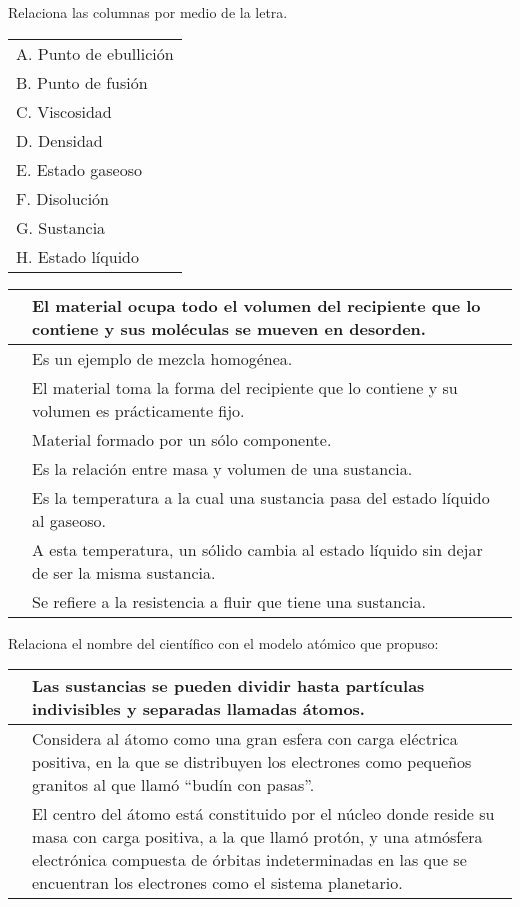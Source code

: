\documentclass[12pt]{exam}
\begin{document}
\begin{questions}
    \question Relaciona las columnas por medio de la letra.
\\[0.5em]
\begin{tabular}{l}
A. Punto de ebullición \\
B. Punto de fusión \\
C. Viscosidad \\
D. Densidad \\
E. Estado gaseoso \\
F. Disolución \\
G. Sustancia \\
H. Estado líquido \\
\end{tabular}
\begin{tabular}{| p{2cm} | p{9cm} |} \hline
 & El material ocupa todo el volumen del recipiente que lo contiene y sus moléculas se mueven en desorden. \\ \hline
 & Es un ejemplo de mezcla homogénea. \\ \hline
 & El material toma la forma del recipiente que lo contiene y su volumen es prácticamente fijo. \\ \hline
 & Material formado por un sólo componente. \\ \hline
 & Es la relación entre masa y volumen de una sustancia. \\ \hline
 & Es la temperatura a la cual una sustancia pasa del estado líquido al gaseoso.\\ \hline
 & A esta temperatura, un sólido cambia al estado líquido sin dejar de ser la misma sustancia. \\ \hline
 & Se refiere a la resistencia a fluir que tiene una sustancia. \\ \hline
\end{tabular}
    \question Relaciona el nombre del científico con el modelo atómico que propuso:
\\[1em]
\begin{tabular}{| p{2cm} | p{10cm} | } \hline
 & Las sustancias se pueden dividir hasta partículas indivisibles y separadas llamadas átomos. \\ \hline
 & Considera al átomo como una gran esfera con carga eléctrica positiva, en la que se distribuyen los electrones como pequeños granitos al que llamó \enquote{budín con pasas}. \\ \hline
 & El centro del átomo está constituido por el núcleo donde reside su masa con carga positiva, a la que llamó protón, y una atmósfera electrónica compuesta de órbitas indeterminadas en las que se encuentran los electrones como el sistema planetario. \\ \hline

\end{tabular}
\end{questions}
\end{document}
